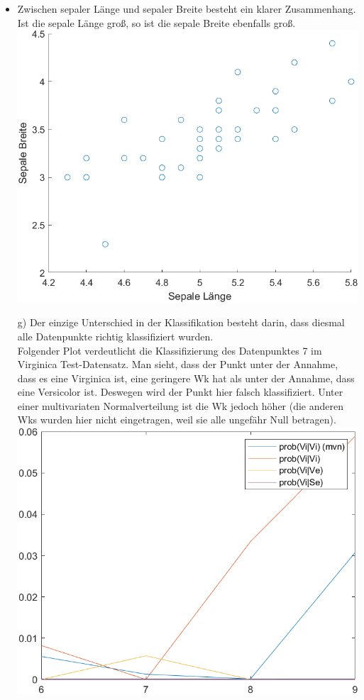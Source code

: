 \documentclass[a4paper]{scrartcl}
\newcounter{punkte}
\begin{document}
\begin{itemize}
		\item Zwischen sepaler Länge und sepaler Breite besteht ein klarer Zusammenhang. Ist die sepale Länge groß, so ist die sepale Breite ebenfalls groß.\\  \includegraphics[width=0.7\linewidth]{assignment2_data/plots/4fiv}


		\item[g)] Der einzige Unterschied in der Klassifikation besteht darin, dass diesmal alle Datenpunkte richtig klassifiziert wurden.\\
		Folgender Plot verdeutlicht die Klassifizierung des Datenpunktes 7 im Virginica Test-Datensatz. Man sieht, dass der Punkt unter der Annahme, dass es eine Virginica ist, eine geringere Wk hat als unter der Annahme, dass eine Versicolor ist. Deswegen wird der Punkt hier falsch klassifiziert. Unter einer multivariaten Normalverteilung ist die Wk jedoch höher (die anderen Wks wurden hier nicht eingetragen, weil sie alle ungefähr Null betragen).\\
		\includegraphics[width=.6\linewidth]{assignment2_data/plots/beispielplot4f}
		\end{itemize}
\end{document}
